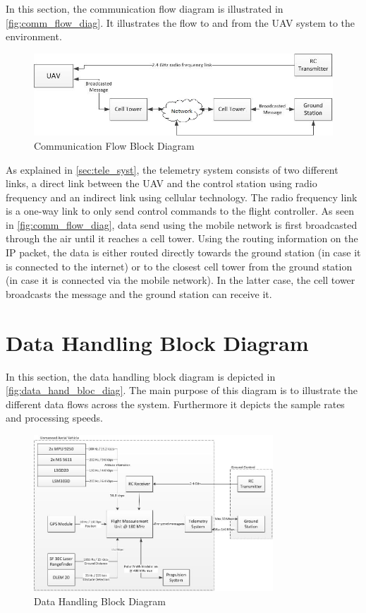 In this section, the communication flow diagram is illustrated in \autoref{fig:comm_flow_diag}. It illustrates the flow to and from the UAV system to the environment. 

\begin{figure}[h]
    \centering
    \includegraphics[width=\textwidth]{./CommandDataHandling/Figures/CommFlowDiagram.jpg}
    \caption{Communication Flow Block Diagram}
    \label{fig:comm_flow_diag}
\end{figure}

As explained in \autoref{sec:tele_syst}, the telemetry system consists of two different links, a direct link between the UAV and the control station using radio frequency and an indirect link using cellular technology. The radio frequency link is a one-way link to only send control commands to the flight controller. As seen in \autoref{fig:comm_flow_diag}, data send using the mobile network is first broadcasted through the air until it reaches a cell tower. Using the routing information on the IP packet, the data is either routed directly towards the ground station (in case it is connected to the internet) or to the closest cell tower from the ground station (in case it is connected via the mobile network). In the latter case, the cell tower broadcasts the message and the ground station can receive it. 

\section{Data Handling Block Diagram}
\label{sec:data_hand_bloc_diag}

In this section, the data handling block diagram is depicted in \autoref{fig:data_hand_bloc_diag}. The main purpose of this diagram is to illustrate the different data flows across the system. Furthermore it depicts the sample rates and processing speeds. 

\begin{figure}[h]
    \centering
    \includegraphics[width=0.8\textwidth]{./CommandDataHandling/Figures/DataDiagram.jpg}
    \caption{Data Handling Block Diagram}
    \label{fig:data_hand_bloc_diag}
\end{figure}

